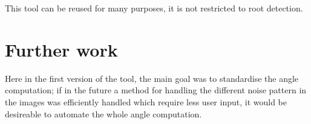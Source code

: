 This tool can be reused for many purposes, it is not restricted to root detection.

\section{Further work}

Here in the first version of the tool, the main goal was to standardise the angle computation; if in the future  a method for handling the different noise pattern in the images was efficiently handled which require less user input, it would be desireable to automate the whole angle computation.





